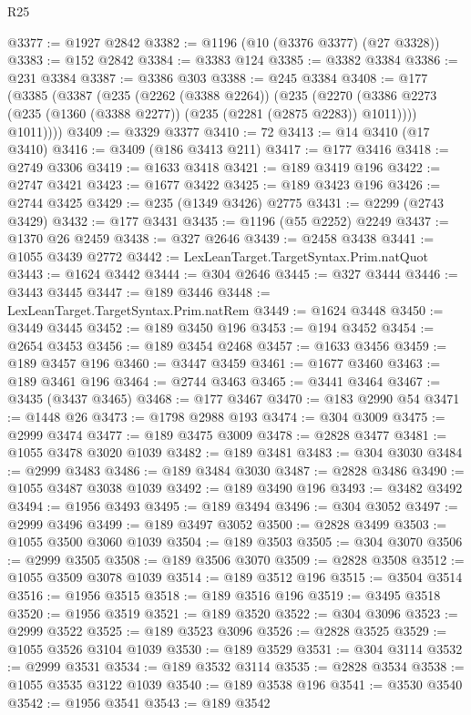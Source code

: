 \begin{lexlean}{R25}
\begin{coremodule}
@3377 := @1927 @2842
@3382 := @1196 (@10 (@3376 @3377) (@27 @3328))
@3383 := @152 @2842
@3384 := @3383 @124
@3385 := @3382 @3384
@3386 := @231 @3384
@3387 := @3386 @303
@3388 := @245 @3384
@3408 := @177
    (@3385
      (@3387
        (@235
          (@2262 (@3388 @2264))
          (@235
            (@2270 (@3386 @2273 (@235 (@1360 (@3388 @2277)) (@235 (@2281 (@2875 @2283)) @1011))))
            @1011))))
@3409 := @3329 @3377
@3410 := 72
@3413 := @14 @3410 (@17 @3410)
@3416 := @3409 (@186 @3413 @211)
@3417 := @177 @3416
@3418 := @2749 @3306
@3419 := @1633 @3418
@3421 := @189 @3419 @196
@3422 := @2747 @3421
@3423 := @1677 @3422
@3425 := @189 @3423 @196
@3426 := @2744 @3425
@3429 := @235 (@1349 @3426) @2775
@3431 := @2299 (@2743 @3429)
@3432 := @177 @3431
@3435 := @1196 (@55 @2252) @2249
@3437 := @1370 @26 @2459
@3438 := @327 @2646
@3439 := @2458 @3438
@3441 := @1055 @3439 @2772
@3442 := LexLeanTarget.TargetSyntax.Prim.natQuot
@3443 := @1624 @3442
@3444 := @304 @2646
@3445 := @327 @3444
@3446 := @3443 @3445
@3447 := @189 @3446
@3448 := LexLeanTarget.TargetSyntax.Prim.natRem
@3449 := @1624 @3448
@3450 := @3449 @3445
@3452 := @189 @3450 @196
@3453 := @194 @3452
@3454 := @2654 @3453
@3456 := @189 @3454 @2468
@3457 := @1633 @3456
@3459 := @189 @3457 @196
@3460 := @3447 @3459
@3461 := @1677 @3460
@3463 := @189 @3461 @196
@3464 := @2744 @3463
@3465 := @3441 @3464
@3467 := @3435 (@3437 @3465)
@3468 := @177 @3467
@3470 := @183 @2990 @54
@3471 := @1448 @26
@3473 := @1798 @2988 @193
@3474 := @304 @3009
@3475 := @2999 @3474
@3477 := @189 @3475 @3009
@3478 := @2828 @3477
@3481 := @1055 @3478 @3020 @1039
@3482 := @189 @3481
@3483 := @304 @3030
@3484 := @2999 @3483
@3486 := @189 @3484 @3030
@3487 := @2828 @3486
@3490 := @1055 @3487 @3038 @1039
@3492 := @189 @3490 @196
@3493 := @3482 @3492
@3494 := @1956 @3493
@3495 := @189 @3494
@3496 := @304 @3052
@3497 := @2999 @3496
@3499 := @189 @3497 @3052
@3500 := @2828 @3499
@3503 := @1055 @3500 @3060 @1039
@3504 := @189 @3503
@3505 := @304 @3070
@3506 := @2999 @3505
@3508 := @189 @3506 @3070
@3509 := @2828 @3508
@3512 := @1055 @3509 @3078 @1039
@3514 := @189 @3512 @196
@3515 := @3504 @3514
@3516 := @1956 @3515
@3518 := @189 @3516 @196
@3519 := @3495 @3518
@3520 := @1956 @3519
@3521 := @189 @3520
@3522 := @304 @3096
@3523 := @2999 @3522
@3525 := @189 @3523 @3096
@3526 := @2828 @3525
@3529 := @1055 @3526 @3104 @1039
@3530 := @189 @3529
@3531 := @304 @3114
@3532 := @2999 @3531
@3534 := @189 @3532 @3114
@3535 := @2828 @3534
@3538 := @1055 @3535 @3122 @1039
@3540 := @189 @3538 @196
@3541 := @3530 @3540
@3542 := @1956 @3541
@3543 := @189 @3542

\end{coremodule}
\end{lexlean}
